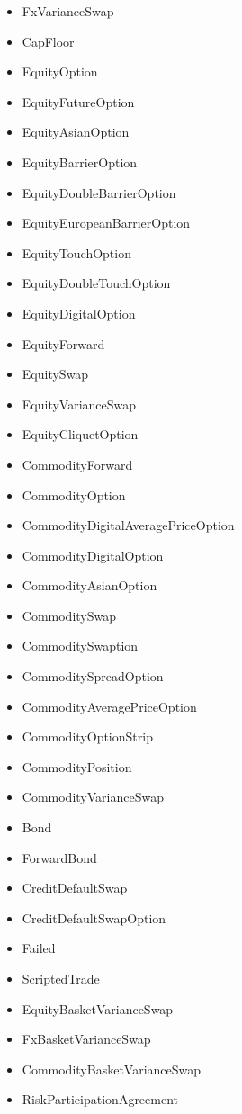 \documentclass[12pt, a4paper]{report}
\begin{document}
\begin{itemize}
      \item FxVarianceSwap
      \item CapFloor
      \item EquityOption
      \item EquityFutureOption
      \item EquityAsianOption
      \item EquityBarrierOption
      \item EquityDoubleBarrierOption
      \item EquityEuropeanBarrierOption
      \item EquityTouchOption
      \item EquityDoubleTouchOption
      \item EquityDigitalOption
      \item EquityForward
      \item EquitySwap
      \item EquityVarianceSwap
      \item EquityCliquetOption
      \item CommodityForward
      \item CommodityOption
      \item CommodityDigitalAveragePriceOption
      \item CommodityDigitalOption
      \item CommodityAsianOption
      \item CommoditySwap
      \item CommoditySwaption
      \item CommoditySpreadOption
      \item CommodityAveragePriceOption
      \item CommodityOptionStrip
      \item CommodityPosition
      \item CommodityVarianceSwap
      \item Bond
      \item ForwardBond
      \item CreditDefaultSwap
      \item CreditDefaultSwapOption
      \item Failed
      \item ScriptedTrade
      \item EquityBasketVarianceSwap
      \item FxBasketVarianceSwap
      \item CommodityBasketVarianceSwap
      \item RiskParticipationAgreement

\end{itemize}
\end{document}
